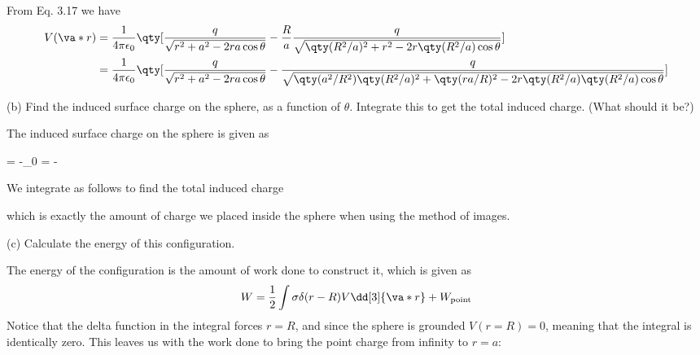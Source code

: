 \documentclass[12pt,a4paper]{article}
\begin{document}
From Eq. 3.17 we have
\begin{align*}
V(\va*{r}) &= \frac{1}{4\pi\epsilon_0}\qty[\frac{q}{\sqrt{r^2 + a^2 - 2ra\cos{\theta}}} - \frac{R}{a}\frac{q}{\sqrt{\qty(R^2/a)^2 + r^2 - 2r\qty(R^2/a)\cos{\theta}}}] \\
&= \frac{1}{4\pi\epsilon_0}\qty[\frac{q}{\sqrt{r^2 + a^2 - 2ra\cos{\theta}}} - \frac{q}{\sqrt{\qty(a^2/R^2)\qty(R^2/a)^2 + \qty(ra/R)^2 - 2r\qty(R^2/a)\qty(R^2/a)\cos{\theta}}}] \\
\end{align*}

(b) Find the induced surface charge on the sphere, as a function of $\theta$. Integrate this to get the total induced charge. (What should it be?)

The induced surface charge on the sphere is given as
\begin{eqbox}
\sigma = -\epsilon_0 = - 
\end{eqbox}

We integrate as follows to find the total induced charge
which is exactly the amount of charge we placed inside the sphere when using the method of images.

(c) Calculate the energy of this configuration.

The energy of the configuration is the amount of work done to construct it, which is given as
\begin{align*}
W = \frac{1}{2}\int \sigma\delta(r-R)V \dd[3]{\va*{r}} + W_{\rm point}
\end{align*}
Notice that the delta function in the integral forces $r = R$, and since the sphere is grounded $V(r=R) = 0$, meaning that the integral is identically zero. This leaves us with the work done to bring the point charge from infinity to $r=a$:
\end{document}
